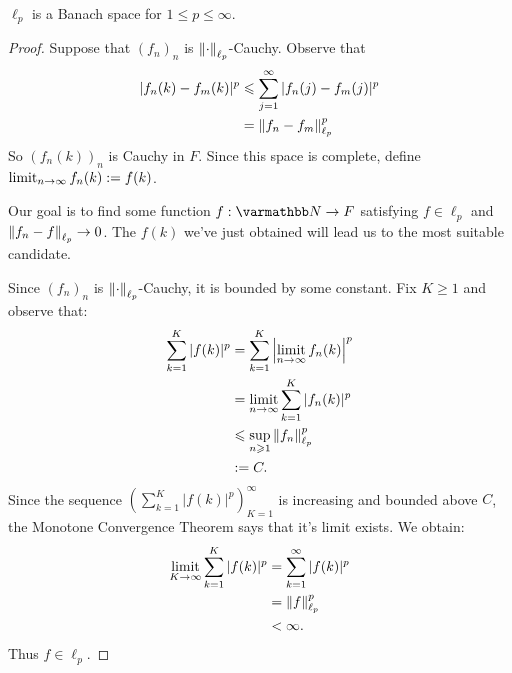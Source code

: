     \begin{proposition}
        $\ell_p$ is a Banach space for $1 \leq p \leq \infty$.
    \end{proposition}
        \begin{proof}
            Suppose that $(f_n)_n$ is $\left\lVert \cdot \right\rVert_{\ell_p}$-Cauchy. Observe that
                \begin{equation*}
                \begin{split}
                    |f_n(k) - f_m(k)|^p
                    & \leqslant \sum_{j = 1}^\infty |f_n(j) - f_m(j)|^p \\
                    & = \left\lVert f_n - f_m \right\rVert_{\ell_p}^p
                \end{split}
                \end{equation*}
            So $(f_n(k))_n$ is Cauchy in $F$. Since this space is complete, define $\operatorname*{limit}_{n \rightarrow \infty}f_n(k) := f(k)$.

            Our goal is to find some function $f:\bfN \rightarrow F$ satisfying $f \in \ell_p$ and $\left\lVert f_n -f \right\rVert_{\ell_p} \rightarrow 0$. The $f(k)$ we've just obtained will lead us to the most suitable candidate.

            Since $(f_n)_n$ is $\left\lVert \cdot \right\rVert_{\ell_p}$-Cauchy, it is bounded by some constant. Fix $K \geq 1$ and observe that:
                \begin{equation*}
                \begin{split}
                    \sum_{k = 1}^K |f(k)|^p 
                    & = \sum_{k = 1}^K\left|\operatorname*{limit}_{n \rightarrow \infty}f_n(k)\right|^p \\
                    & = \operatorname*{limit}_{n \rightarrow \infty}\sum_{k = 1}^K |f_n(k)|^p \\
                    & \leqslant \sup_{n \geqslant 1}\left\lVert f_n \right\rVert_{\ell_p}^p \\
                    & := C.
                \end{split}
                \end{equation*}
            Since the sequence $\left( \sum_{k = 1}^K |f(k)|^p \right)_{K = 1}^\infty$ is increasing and bounded above $C$, the Monotone Convergence Theorem says that it's limit exists. We obtain:
                \begin{equation*}
                \begin{split}
                    \operatorname*{limit}_{K \rightarrow \infty}\sum_{k = 1}^K |f(k)|^p 
                    & = \sum_{k = 1}^\infty |f(k)|^p \\
                    & = \left\lVert f \right\rVert_{\ell_p}^p \\
                    & < \infty.
                \end{split}
                \end{equation*}
            Thus $f \in \ell_p$.


\end{proof}
